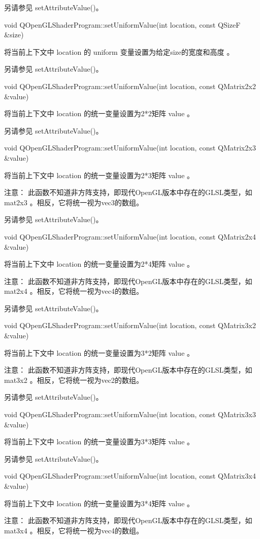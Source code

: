 另请参见 setAttributeValue()。

void QOpenGLShaderProgram::setUniformValue(int location, const QSizeF \&size)

将当前上下文中 location 的 uniform 变量设置为给定size的宽度和高度 。

另请参见 setAttributeValue()。

void QOpenGLShaderProgram::setUniformValue(int location, const QMatrix2x2 \&value)

将当前上下文中 location 的统一变量设置为2*2矩阵 value 。

另请参见 setAttributeValue()。

void QOpenGLShaderProgram::setUniformValue(int location, const QMatrix2x3 \&value)

将当前上下文中 location 的统一变量设置为2*3矩阵 value 。

注意： 此函数不知道非方阵支持，即现代OpenGL版本中存在的GLSL类型，如 mat2x3 。相反，它将统一视为vec3的数组。

另请参见 setAttributeValue()。

void QOpenGLShaderProgram::setUniformValue(int location, const QMatrix2x4 \&value)

将当前上下文中 location 的统一变量设置为2*4矩阵 value 。

注意： 此函数不知道非方阵支持，即现代OpenGL版本中存在的GLSL类型，如 mat2x4 。相反，它将统一视为vec4的数组。

另请参见 setAttributeValue()。

void QOpenGLShaderProgram::setUniformValue(int location, const QMatrix3x2 \&value)

将当前上下文中 location 的统一变量设置为3*2矩阵 value 。

注意： 此函数不知道非方阵支持，即现代OpenGL版本中存在的GLSL类型，如 mat3x2 。相反，它将统一视为vec2的数组。

另请参见 setAttributeValue()。

void QOpenGLShaderProgram::setUniformValue(int location, const QMatrix3x3 \&value)

将当前上下文中 location 的统一变量设置为3*3矩阵 value 。

另请参见 setAttributeValue()。

void QOpenGLShaderProgram::setUniformValue(int location, const QMatrix3x4 \&value)

将当前上下文中 location 的统一变量设置为3*4矩阵 value 。

注意： 此函数不知道非方阵支持，即现代OpenGL版本中存在的GLSL类型，如 mat3x4 。相反，它将统一视为vec4的数组。

